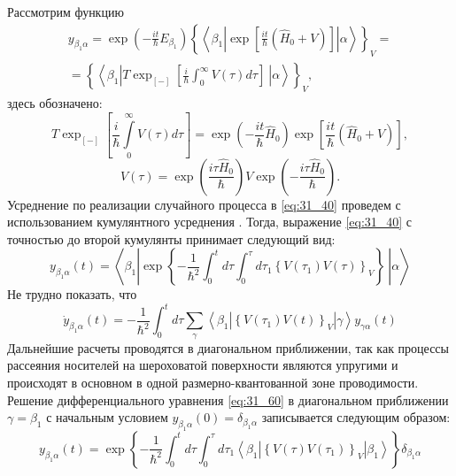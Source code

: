 Рассмотрим функцию
\begin{multline} \label{eq:31_40}
y_{{\beta }_1\alpha }=\exp\left(-\frac{it}{\hbar }E_{\beta_1}\right){\left\{\left\langle {\beta }_1\left|\exp\left[ {\frac{it}{\hbar }\left( {\hat {H}_0 + V} \right)} \right]\right|\alpha \right\rangle \right\}}_V=\\
={\left\{\left\langle {\beta }_1\left|T{\exp_{[-]} \left[\frac{i}{\hbar }\int^{\infty }_0{V\left(\tau \right)d \tau }\right]\ }\right|\alpha \right\rangle \right\}}_V,
\end{multline}
здесь обозначено:
\[
T{\exp_{\left[-\right]} \left[\frac{i}{\hbar }\int\limits^{\infty }_0 {V\left(\tau \right)d \tau } \right]}
	=\exp\left( {-\frac{it}{\hbar }\hat {H}_0 }\right)\exp\left[ {\frac{it}{\hbar }\left( {\hat {H}_0 + V} \right)} \right],
\] 
\[
V(\tau ) = \exp\left( {\frac{i\tau \hat {H}_0 }{\hbar }}\right)
V\exp\left( { - \frac{i\tau \hat {H}_0 }{\hbar }} \right).
\]
Усреднение по реализации случайного процесса в \eqref{eq:31_40} проведем с использованием кумулянтного усреднения \cite{Kubo1957a}. Тогда, выражение \eqref{eq:31_40} с точностью до второй кумулянты принимает следующий вид:
\[
y_{{\beta }_1\alpha }\left(t\right)=\left\langle {\beta }_1\left|{\exp \left\{-\frac{1}{{\hbar }^2}\int^t_0{d \tau \int^{\tau }_0{d {\tau }_1{\left\{V\left({\tau }_1\right)V\left(\tau \right)\right\}}_V}}\right\}\ }\right|\alpha \right\rangle
\]
Не трудно показать, что
\begin{equation} \label{eq:31_60}
{\dot{y}}_{{\beta }_1\alpha }\left(t\right)=-\frac{1}{{\hbar }^2}\int^t_0{d \tau \sum_{\gamma }{\left\langle {\beta }_1\left|{\left\{V\left({\tau }_1\right)V\left(t\right)\right\}}_V\right|\gamma \right\rangle y_{\gamma \alpha }\left(t\right)}}
\end{equation} 
Дальнейшие расчеты проводятся в диагональном приближении, так как процессы рассеяния носителей на шероховатой поверхности являются упругими и происходят в основном в одной размерно-квантованной зоне проводимости. Решение дифференциального уравнения \eqref{eq:31_60} в диагональном приближении $\gamma ={\beta }_1$ с начальным условием $y_{{\beta }_1\alpha }\left(0\right)={\delta }_{{\beta }_1\alpha }$ записывается следующим образом:
\begin{equation} \label{eq:31_70}
y_{\beta_1\alpha }(t)=\exp \left\{-\frac{1}{{\hbar }^2}\int^t_0{d \tau \int^{\tau }_0{d {\tau }_1\left\langle {\beta }_1\left|{\left\{V\left(\tau \right)V\left({\tau }_1\right)\right\}}_V\right|{\beta }_1\right\rangle }}\right\}{\delta }_{{\beta }_1\alpha }
\end{equation} 

